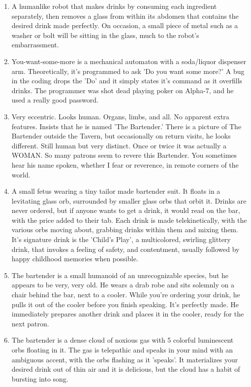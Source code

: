 \documentclass{article}
\begin{document}
\begin{enumerate}
	\item A humanlike robot that makes drinks by consuming each ingredient separately, then removes a glass from within its abdomen that contains the desired drink made perfectly. On occasion, a small piece of metal such as a washer or bolt will be sitting in the glass, much to the robot's embarrassment.
	\item You-want-some-more is a mechanical automaton with a soda/liquor dispenser arm. Theoretically, it's programmed to ask 'Do you want some more?' A bug in the coding drops the 'Do' and it simply states it's command as it overfills drinks. The programmer was shot dead playing poker on Alpha-7, and he used a really good password.
	\item Very eccentric. Looks human. Organs, limbs, and all. No apparent extra features. Insists that he is named 'The Bartender.' There is a picture of The Bartender outside the Tavern, but occasionally on return visits, he looks different. Still human but very distinct. Once or twice it was actually a WOMAN. So many patrons seem to revere this Bartender. You sometimes hear his name spoken, whether I fear or reverence, in remote corners of the world.
	\item A small fetus wearing a tiny tailor made bartender suit. It floats in a levitating glass orb, surrounded by smaller glass orbs that orbit it. Drinks are never ordered, but if anyone wants to get a drink, it would read on the bar, with the price added to their tab. Each drink is made telekinetically, with the various orbs moving about, grabbing drinks within them and mixing them. It's signature drink is the 'Child's Play', a multicolored, swirling glittery drink, that invokes a feeling of safety, and contentment, usually followed by happy childhood memories when possible.
	\item The bartender is a small humanoid of an unrecognizable species, but he appears to be very, very old. He wears a drab robe and sits solemnly on a chair behind the bar, next to a cooler. While you're ordering your drink, he pulls it out of the cooler before you finish speaking. It's perfectly made. He immediately prepares another drink and places it in the cooler, ready for the next patron.
	\item The bartender is a dense cloud of noxious gas with 5 colorful luminescent orbs floating in it. The gas is telepathic and speaks in your mind with an ambiguous accent, with the orbs flashing as it 'speaks'. It materializes your desired drink out of thin air and it is delicious, but the cloud has a habit of bursting into song.

\end{enumerate}
\end{document}
